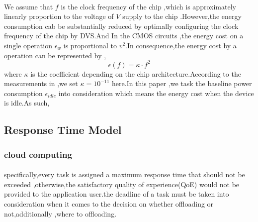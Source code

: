 \documentclass[review]{elsarticle}
\begin{document}
             \paragraph{} We assume that \begin{math} f \end{math} is the clock frequency of the chip ,which is approximately linearly proportion to the voltage of \begin{math} V \end{math} supply to the chip .However,the energy consumption cab be substantially reduced by optimally configuring the clock frequency of the chip by DVS\citep{rabaey2002digital}.And In the CMOS circuits\citep{wen2012energy} ,the energy cost on a single operation \begin{math} \epsilon_w \end{math} is proportional to \begin{math} {v^2} \end{math}.In consequence,the energy cost by a operation can be represented by ,\\
             $$ \epsilon(f)=\kappa\cdot{f^2}$$
             where \begin{math}\kappa \end{math} is the coefficient depending on the chip architecture.According to the measurements in \citep{miettinen2010energy} ,we set  \begin{math} \kappa=10^{-11} \end{math} here.In this paper ,we task the baseline power consumption \begin{math} \epsilon_{idle}\end{math} into consideration which means the energy cost when the device is idle.As such,

        \subsection{Response Time Model}
            \subsubsection{cloud computing}
            \paragraph{} specifically,every task is assigned a maximum response time that should not be exceeded ,otherwise,the satisfactory quality of experience(QoE) would not be provided to the application user.the deadline of a task must be taken into consideration when it comes to the decision on whether offloading or not,additionally ,where to offloading.
\end{document}
